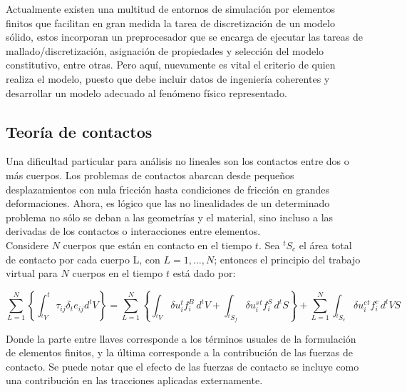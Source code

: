 Actualmente existen una multitud de entornos de simulación por elementos finitos que 
facilitan en gran medida la tarea de discretización de un modelo sólido, estos incorporan 
un preprocesador que se encarga de ejecutar las tareas de mallado/discretización, asignación 
de propiedades y selección del modelo constitutivo, entre otras. Pero aquí, nuevamente 
es vital el criterio de quien realiza el modelo, puesto que debe incluir datos de ingeniería 
coherentes y desarrollar un modelo adecuado al fenómeno físico representado.

\subsection{Teoría de contactos}

Una dificultad particular para análisis no lineales son los contactos entre dos o más 
cuerpos. Los problemas de contactos abarcan desde pequeños desplazamientos con nula  
fricción hasta condiciones de fricción en grandes deformaciones. Ahora, es lógico que 
las no linealidades de un determinado problema no sólo se deban a las geometrías y el 
material, sino incluso a las derivadas de los contactos o interacciones entre elementos.
~\cite{bathe1996} \\

Considere $N$ cuerpos que están en contacto en el tiempo $t$. Sea $^tS_c$ el área total 
de contacto por cada cuerpo L, con $L=1,...,N$; entonces el principio del trabajo virtual 
para $N$ cuerpos en el tiempo $t$ está dado por:

\begin{equation} \label{eq:contact_n}
\sum\limits_{L=1}^N \left\{ \int_{^tV} ^t\tau_{ij} \delta_t e_{ij} d^t V \right\} = 
\sum\limits_{L=1}^N \left\{ 
\int_{^tV} \delta u_i ^tf_i^B \, d^t V + 
\int_{^tS_f} \delta u_i^s ^tf_i^S \, d^t S
\right\} + 
\sum\limits_{L=1}^N \int_{^tS_c} \delta u_i^c ^tf_i^c \, d^t VS
\end{equation}

Donde la parte entre llaves corresponde a los términos usuales de la formulación de elementos 
finitos, y la última corresponde a la contribución de las fuerzas de contacto. Se puede 
notar que el efecto de las fuerzas de contacto se incluye como una contribución en las 
tracciones aplicadas externamente.\\

